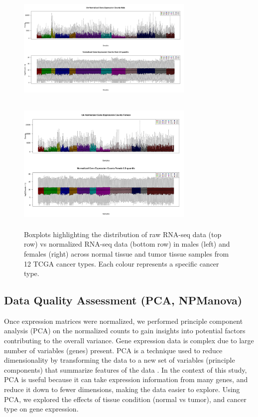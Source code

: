 \documentclass[10pt]{article}
\begin{document}
	\begin{figure}[!h]
		\centering	
		\includegraphics[width=8.5cm, height=6cm]{normalied_male.png}\hfill
		\includegraphics[width=8.5cm, height=6cm]{normalied_female.png}
		\caption{Boxplots highlighting the distribution of raw RNA-seq data (top row) vs normalized RNA-seq data (bottom row) in males (left) and females (right) across normal tissue and tumor tissue samples from 12 TCGA cancer types. Each colour represents a specific cancer type.}
		\label{fig:1}
	\end{figure}

	\subsection{Data Quality Assessment (PCA, NPManova)}
	
	Once expression matrices were normalized, we performed principle component analysis (PCA) on the normalized counts to gain insights into potential factors contributing to the overall variance. Gene expression data is complex due to large number of variables (genes) present. PCA is a technique used to reduce dimensionality by transforming the data to a new set of variables (principle components) that summarize features of the data \citep{yeung2001principal}. In the context of this study, PCA is useful because it can take expression information from many genes, and reduce it down to fewer dimensions, making the data easier to explore. Using PCA, we explored the effects of tissue condition (normal vs tumor), and cancer type on gene expression. 
\end{document}
